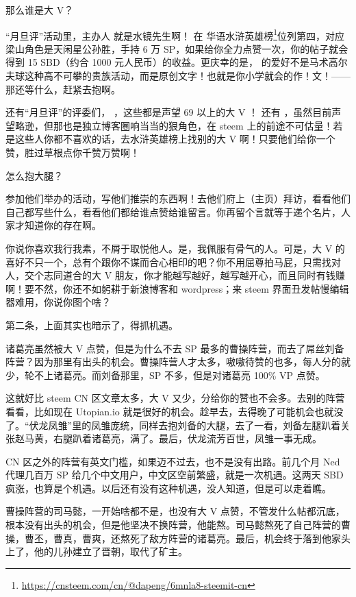 \documentclass[]{ctexbook}
\renewcommand{\href}[2]{#2\footnote{\url{#1}}}
\begin{document}
那么谁是大 V？

``月旦评''活动里，主办人 \citet{rivalhw} 就是水镜先生啊！\citet{rivalhw} 在 \href{https://cnsteem.com/cn/@dapeng/6mnla8-steemit-cn}{华语水浒英雄榜}位列第四，对应梁山角色是天闲星公孙胜，手持 6 万 SP，如果给你全力点赞一次，你的帖子就会得到 15 SBD（约合 1000 元人民币）的收益。更庆幸的是，\citet{rivalhw} 的爱好不是马术高尔夫球这种高不可攀的贵族活动，而是原创文字！也就是你小学就会的作！文！------那还等什么，赶紧去抱啊。

还有``月旦评''的评委们， \citet{deanliu} \citet{lemooljiang} \citet{tumutanzi}，这些都是声望 69 以上的大 V ！ 还有 \citet{hannahwu}，虽然目前声望略逊，但那也是独立博客圈响当当的狠角色，在 steem 上的前途不可估量！若是这些人你都不喜欢的话，去水浒英雄榜上找别的大 V 啊！只要他们给你一个赞，胜过草根点你千赞万赞啊！

怎么抱大腿？

参加他们举办的活动，写他们推崇的东西啊！去他们府上（主页）拜访，看看他们自己都写些什么，看看他们都给谁点赞给谁留言。你再留个言就等于递个名片，人家才知道你的存在啊。

你说你喜欢我行我素，不屑于取悦他人。是，我佩服有骨气的人。可是，大 V 的喜好不只一个，总有个跟你不谋而合心相印的吧？你不用屈尊拍马屁，只需找对人，交个志同道合的大 V 朋友，你才能越写越好，越写越开心，而且同时有钱赚啊！要不然，你还不如躬耕于新浪博客和 wordpress；来 steem 界面丑发帖慢编辑器难用，你说你图个啥？

第二条，上面其实也暗示了，得抓机遇。

诸葛亮虽然被大 V 点赞，但是为什么不去 SP 最多的曹操阵营，而去了屌丝刘备阵营？因为那里有出头的机会。曹操阵营人才太多，嗷嗷待赞的也多，每人分的就少，轮不上诸葛亮。而刘备那里，SP 不多，但是对诸葛亮 100\% VP 点赞。

这就好比 steem CN 区文章太多，大 V 又少，分给你的赞也不会多。去别的阵营看看，比如现在 Utopian.io 就是很好的机会。趁早去，去得晚了可能机会也就没了。``伏龙凤雏''里的凤雏庞统，同样去抱刘备的大腿，去了一看，刘备左腿趴着关张赵马黄，右腿趴着诸葛亮，满了。最后，伏龙流芳百世，凤雏一事无成。

CN 区之外的阵营有英文门槛，如果迈不过去，也不是没有出路。前几个月 Ned 代理几百万 SP 给几个中文用户，中文区空前繁盛，就是一次机遇。这两天 SBD 疯涨，也算是个机遇。以后还有没有这种机遇，没人知道，但是可以走着瞧。

曹操阵营的司马懿，一开始啥都不是，也没有大 V 点赞，不管发什么帖都沉底，根本没有出头的机会，但是他坚决不换阵营，他能熬。司马懿熬死了自己阵营的曹操，曹丕，曹真，曹爽，还熬死了敌方阵营的诸葛亮。最后，机会终于落到他家头上了，他的儿孙建立了晋朝，取代了矿主。
\end{document}

